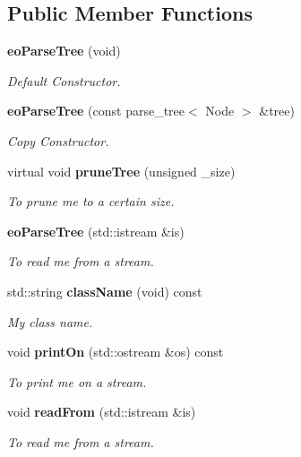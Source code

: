 \subsection*{Public Member Functions}
\begin{CompactItemize}
\item 
{\bf eo\-Parse\-Tree} (void)\label{classeo_parse_tree_a0}

\begin{CompactList}\small\item\em Default Constructor. \item\end{CompactList}\item 
{\bf eo\-Parse\-Tree} (const parse\_\-tree$<$ Node $>$ \&tree)
\begin{CompactList}\small\item\em Copy Constructor. \item\end{CompactList}\item 
virtual void {\bf prune\-Tree} (unsigned \_\-size)
\begin{CompactList}\small\item\em To prune me to a certain size. \item\end{CompactList}\item 
{\bf eo\-Parse\-Tree} (std::istream \&is)
\begin{CompactList}\small\item\em To read me from a stream. \item\end{CompactList}\item 
std::string {\bf class\-Name} (void) const \label{classeo_parse_tree_a4}

\begin{CompactList}\small\item\em My class name. \item\end{CompactList}\item 
void {\bf print\-On} (std::ostream \&os) const 
\begin{CompactList}\small\item\em To print me on a stream. \item\end{CompactList}\item 
void {\bf read\-From} (std::istream \&is)
\begin{CompactList}\small\item\em To read me from a stream. \item\end{CompactList}\end{CompactItemize}


